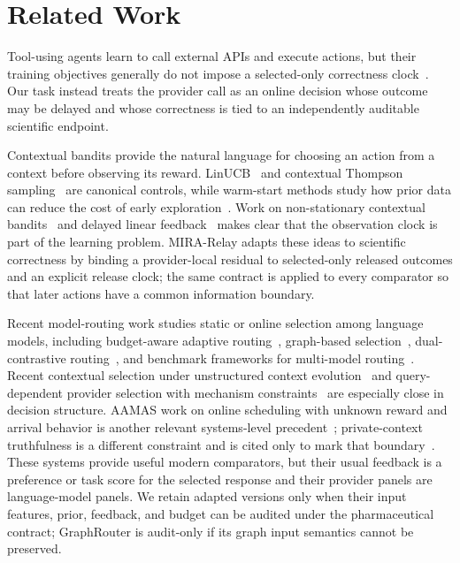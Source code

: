 \documentclass[sigconf,anonymous]{aamas}
\begin{document}
\section{Related Work}
Tool-using agents learn to call external APIs and execute actions, but their training objectives generally do not impose a selected-only correctness clock~\cite{schick2023toolformer,yao2023react}. Our task instead treats the provider call as an online decision whose outcome may be delayed and whose correctness is tied to an independently auditable scientific endpoint.

Contextual bandits provide the natural language for choosing an action from a context before observing its reward. LinUCB~\cite{li2010contextual} and contextual Thompson sampling~\cite{agrawal2013thompson} are canonical controls, while warm-start methods study how prior data can reduce the cost of early exploration~\cite{oetomo2023warmstart}. Work on non-stationary contextual bandits~\cite{wu2018nonstationary} and delayed linear feedback~\cite{vernade2018linear,joulani2013online} makes clear that the observation clock is part of the learning problem. MIRA-Relay adapts these ideas to scientific correctness by binding a provider-local residual to selected-only released outcomes and an explicit release clock; the same contract is applied to every comparator so that later actions have a common information boundary.

Recent model-routing work studies static or online selection among language models, including budget-aware adaptive routing~\cite{panda2025pilot,dai2024c2mabv}, graph-based selection~\cite{feng2025graphrouter}, dual-contrastive routing~\cite{chen2024routerdc}, and benchmark frameworks for multi-model routing~\cite{hu2024routerbench}. Recent contextual selection under unstructured context evolution~\cite{poon2025contextEvolution} and query-dependent provider selection with mechanism constraints~\cite{patra2026reverse} are especially close in decision structure. AAMAS work on online scheduling with unknown reward and arrival behavior is another relevant systems-level precedent~\cite{xu2024onlineSchedule}; private-context truthfulness is a different constraint and is cited only to mark that boundary~\cite{hu2025truthful}. These systems provide useful modern comparators, but their usual feedback is a preference or task score for the selected response and their provider panels are language-model panels. We retain adapted versions only when their input features, prior, feedback, and budget can be audited under the pharmaceutical contract; GraphRouter is audit-only if its graph input semantics cannot be preserved.
\end{document}
